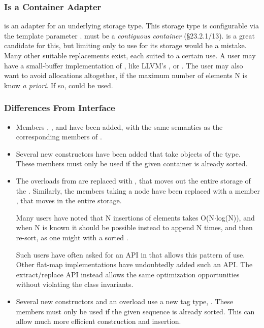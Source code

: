 \subsubsection{ Is a Container Adapter}

 is an adapter for an underlying storage type.  This storage
type is configurable via the template parameter .
 must be a \textit{contiguous container} (\S23.2.1/13).
 is a great candidate for this, but limiting  only
to use  for its storage would be a mistake.  Many other suitable
replacements exist, each suited to a certain use.  A user may have a
small-buffer implementation of , like LLVM's ,
or .  The user may also want to avoid
allocations altogether, if the maximum number of elements N is know \textit{a
  priori}.  If so,  could be used.

\subsubsection{Differences From  Interface}

\begin{itemize}
  \item Members , , and 
    have been added, with the same semantics as the corresponding members of
    .

  \item Several new constructors have been added that take objects of the
     type.  These members must only be used if the given
    container is already sorted.

  \item The  overloads from  are replaced with
    , that moves out the entire storage of the
    .  Similarly, the  members taking a node
    have been replaced with a member , that
    moves in the entire storage.

    Many users have noted that N insertions of elements takes
    O(N$\cdot$log(N)), and when N is known it should be possible instead to
    append N times, and then re-sort, as one might with a sorted
    .

    Such users have often asked for an API in
     that allows this pattern of use.  Other
    flat-map implementations have undoubtedly added such an API.  The
    extract/replace API instead allows the same optimization opportunities
    without violating the class invariants.

  \item Several new constructors and an  overload use a new tag
    type, .  These members must only be used
    if the given sequence is already sorted.  This can allow much more
    efficient construction and insertion.
\end{itemize}

